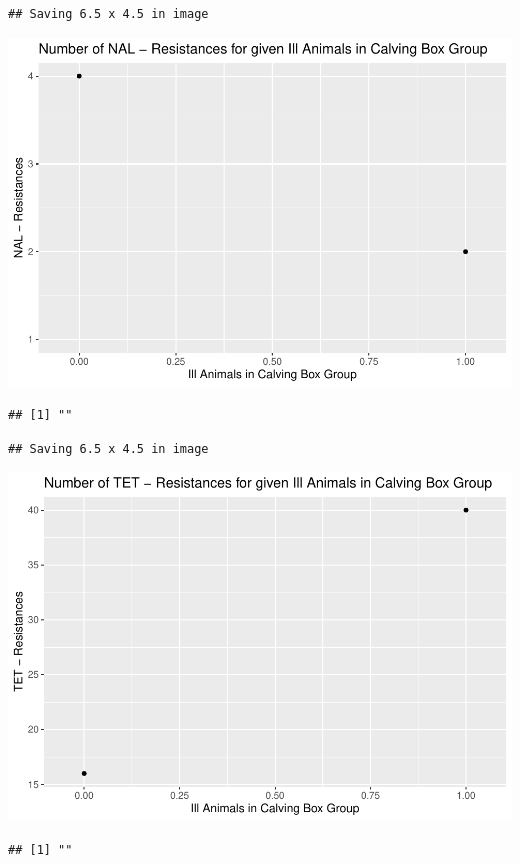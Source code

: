 \documentclass[
]{article}
\begin{document}
\begin{verbatim}
## Saving 6.5 x 4.5 in image
\end{verbatim}

\includegraphics{NResistenzen_files/figure-latex/binary_or_nominal_variables-27.pdf}

\begin{verbatim}
## [1] ""
\end{verbatim}

\begin{verbatim}
## Saving 6.5 x 4.5 in image
\end{verbatim}

\includegraphics{NResistenzen_files/figure-latex/binary_or_nominal_variables-28.pdf}

\begin{verbatim}
## [1] ""
\end{verbatim}
\end{document}
